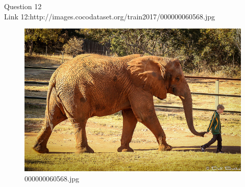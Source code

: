 Question 12\\
Link 12:http://images.cocodataset.org/train2017/000000060568.jpg
    \begin{figure}[h]
        \centering
        \includegraphics[width=0.8\linewidth]{../image set/easy/000000060568.jpg}
        \caption{000000060568.jpg}
    \end{figure}
